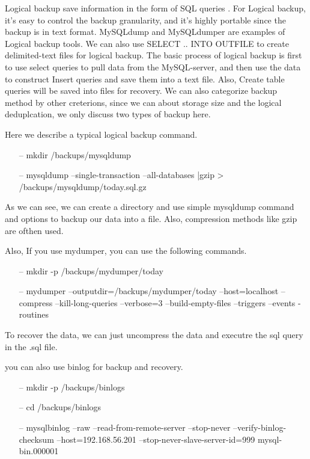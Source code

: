 Logical backup save information in the form of SQL queries \citep{mysqlbackupdocumentatio}. For Logical backup, it's easy to control the backup granularity, and it's highly portable since the backup is in text format. MySQLdump and MySQLdumper\citep{mysqldumpper} are examples of Logical backup tools. We can also use SELECT .. INTO OUTFILE to create delimited-text files for logical backup. The basic process of logical backup is first to use select queries to pull data from the MySQL-server, and then use the data to construct Insert queries and save them into a text file. Also, Create table queries will be saved into files for recovery. We can also categorize backup method by other creterions, since we can about storage size and the logical deduplcation, we only discuss two types of backup here.





Here we describe a typical logical backup command.


\begin{itemize}
\item[--] mkdir /backups/mysqldump
\item[--] mysqldump --single-transaction --all-databases |gzip > /backups/mysqldump/today.sql.gz 
\end{itemize}






                                                 

As we can see, we can create a directory and use simple mysqldump command and options to backup our data into a file. Also, compression methods like gzip are ofthen used.

Also, If you use mydumper, you can use the following commands.

\begin{itemize}
\item[--] mkdir -p /backups/mydumper/today
\item[--] mydumper --outputdir=/backups/mydumper/today --host=localhost --compress --kill-long-queries --verbose=3 --build-empty-files --triggers --events -routines 
\end{itemize}

 
To recover the data, we can just uncompress the data and executre the sql query in the .sql file. 

you can also use binlog for backup and recovery.

\begin{itemize}
\item[--] mkdir -p /backups/binlogs
\item[--] cd /backups/binlogs
\item[--] mysqlbinlog --raw --read-from-remote-server --stop-never --verify-binlog-checksum --host=192.168.56.201 --stop-never-slave-server-id=999 mysql-bin.000001
\end{itemize}


